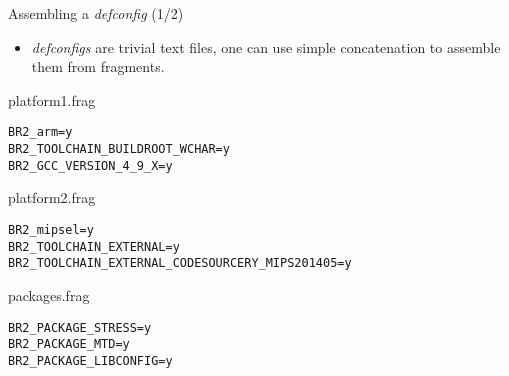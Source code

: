 \begin{frame}[fragile]{Assembling a {\em defconfig} (1/2)}

  \begin{itemize}
  \item {\em defconfigs} are trivial text files, one can use simple
    concatenation to assemble them from fragments.
  \end{itemize}

{\small
   \begin{block}{platform1.frag}
\begin{verbatim}
BR2_arm=y
BR2_TOOLCHAIN_BUILDROOT_WCHAR=y
BR2_GCC_VERSION_4_9_X=y
\end{verbatim}
   \end{block}
}

{\small
    \begin{block}{platform2.frag}
\begin{verbatim}
BR2_mipsel=y
BR2_TOOLCHAIN_EXTERNAL=y
BR2_TOOLCHAIN_EXTERNAL_CODESOURCERY_MIPS201405=y
\end{verbatim}
    \end{block}
}

{\small
   \begin{block}{packages.frag}
\begin{verbatim}
BR2_PACKAGE_STRESS=y
BR2_PACKAGE_MTD=y
BR2_PACKAGE_LIBCONFIG=y
\end{verbatim}
   \end{block}
}

\end{frame}

